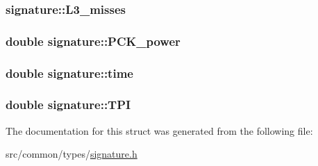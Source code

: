 \subsubsection[{\texorpdfstring{L3\+\_\+misses}{L3_misses}}]{ signature\+::\+L3\+\_\+misses}\hypertarget{structsignature_a2f53eb030809b1ee5cc6c3c189a48268}{}\label{structsignature_a2f53eb030809b1ee5cc6c3c189a48268}
\subsubsection[{\texorpdfstring{P\+C\+K\+\_\+power}{PCK_power}}]{\setlength{\rightskip}{0pt plus 5cm}double signature\+::\+P\+C\+K\+\_\+power}\hypertarget{structsignature_a64959c9028a6777f27869c5f8c57e8d0}{}\label{structsignature_a64959c9028a6777f27869c5f8c57e8d0}
\subsubsection[{\texorpdfstring{time}{time}}]{\setlength{\rightskip}{0pt plus 5cm}double signature\+::time}\hypertarget{structsignature_a2416e49937e7ca368c9a4bc353dede86}{}\label{structsignature_a2416e49937e7ca368c9a4bc353dede86}
\subsubsection[{\texorpdfstring{T\+PI}{TPI}}]{\setlength{\rightskip}{0pt plus 5cm}double signature\+::\+T\+PI}\hypertarget{structsignature_a6ac9b090ff02df18291fe2c753ad0a9b}{}\label{structsignature_a6ac9b090ff02df18291fe2c753ad0a9b}


The documentation for this struct was generated from the following file\+:\begin{DoxyCompactItemize}
\item 
src/common/types/\hyperlink{signature_8h}{signature.\+h}\end{DoxyCompactItemize}

